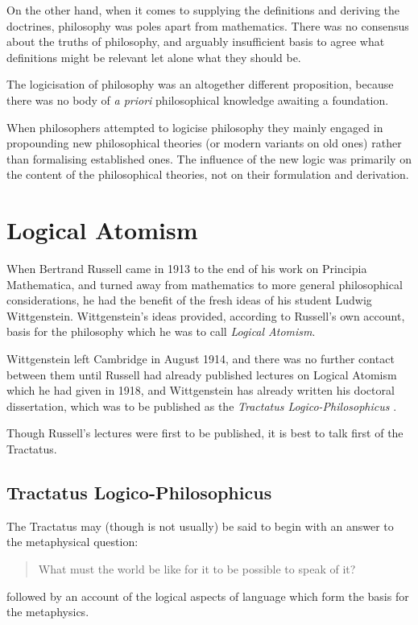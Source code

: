 On the other hand, when it comes to supplying the definitions and deriving the doctrines, philosophy was poles apart from mathematics.
There was no consensus about the truths of philosophy, and arguably insufficient basis to agree what definitions might be relevant let alone what they should be.

The logicisation of philosophy was an altogether different proposition, because there was no body of {\it a priori} philosophical knowledge awaiting a foundation.

When philosophers attempted to logicise philosophy they mainly engaged in propounding new philosophical theories (or modern variants on old ones) rather than formalising established ones.
The influence of the new logic was primarily on the content of the philosophical theories, not on their formulation and derivation.

\section{Logical Atomism}


When Bertrand Russell came in 1913 to the end of his work on Principia Mathematica, and turned away from mathematics to more general philosophical considerations, he had the benefit of the fresh ideas of his student Ludwig Wittgenstein.
Wittgenstein's ideas provided, according to Russell's own account, basis for the philosophy which he was to call {\it Logical Atomism}.

Wittgenstein left Cambridge in August 1914, and there was no further contact between them until Russell had already published lectures on Logical Atomism which he had given in 1918, and Wittgenstein has already written his doctoral dissertation, which was to be published as the {\it Tractatus Logico-Philosophicus} \cite{wittgenstein1921}.

Though Russell's lectures were first to be published, it is best to talk first of the Tractatus.

\subsection{Tractatus Logico-Philosophicus}


The Tractatus may (though is not usually) be said to begin with an answer to the metaphysical question:
\begin{quotation}
What must the world be like for it to be possible to speak of it?
\end{quotation}
followed by an account of the logical aspects of language which form the basis for the metaphysics.

